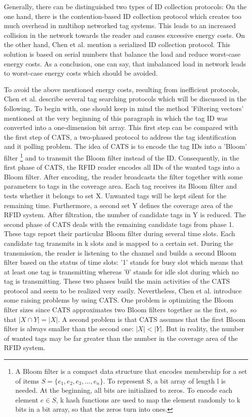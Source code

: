 Generally, there can be distinguished two types of ID collection protocols: On the one hand, there is the contention-based ID collection protocol which creates too much overhead in multihop networked tag systems. This leads to an increased collision in the network towards the reader and causes excessive energy costs. On the other hand, Chen et al. mention a serialized ID collection protocol. This solution is based on serial numbers that balance the load and reduce worst-case energy costs. 
As a conclusion, one can say, that imbalanced load in network leads to worst-case energy costs which should be avoided.

To avoid the above mentioned energy costs, resulting from inefficient protocols, Chen et al. describe several tag searching protocols \cite[p.13 ff.]{chen} which will be discussed in the following. 
To begin with, one should keep in mind the method 'Filtering vectors' mentioned at the very beginning of this paragraph in which the tag ID was converted into a one-dimension bit array. This first step can be compared with the first step of \ac{CATS}, a two-phased protocol to address the tag identification and it polling problem. The idea of CATS is to encode the tag IDs into a 'Bloom' filter \footnote{A Bloom filter is a compact data structure that encodes membership for a set of items $S=\{ e_{1},e_{2},e_{3},...,e_{n}\}$. To represent S, a bit array of length l is needed. At the beginning, all bits are initialized to zeros. To encode each element $e \in S$, k hash functions are used to map the element randomly to k bits in a bit array, so that the zeros turn into ones.}  \cite[p.15]{chen} and to transmit the Bloom filter instead of the ID. 
Consequently, in the first phase of CATS, the RFID reader encodes all IDs of the wanted tags into a Bloom filter. After encoding, the reader broadcasts the filter together with some parameters to tags in the coverage area. Each tag receives its Bloom filter and tests whether it belongs to  set X. Unwanted tags will be kept silent for the remaining time. Furthermore, a second set Y defines the coverage area of the RFID system. After filtration, the number of candidate tags in Y is reduced.
The second phase of CATS deals with the remaining candidate tags from phase 1. These tags report their particular Bloom filter during several time slots. Each candidate tag transmits in k slots and is mapped to a certain set. During the transmission, the reader is listening to the channel and builds a second Bloom filter based on the status of time slots: '1' stands for busy slot which means that at least one tag is transmitting whereas '0' stands for idle slot during which no tag is transmitting. 
These two phases build the main activities of the CATS protocol and seem to be realized very easily. Nevertheless, Chen et al. introduce some raising problems by using CATS. One problem is optimizing the Bloom filter sizes since CATS approximates two Bloom filters together as the first, so that $|X \cap Y|=|X|$. A second problem is that CATS assumes that the first Bloom filter is always smaller than the second one: $|X|<|Y|$. But in reality, the number of wanted tags may be far greater than the number in the coverage area of the RFID system. 
